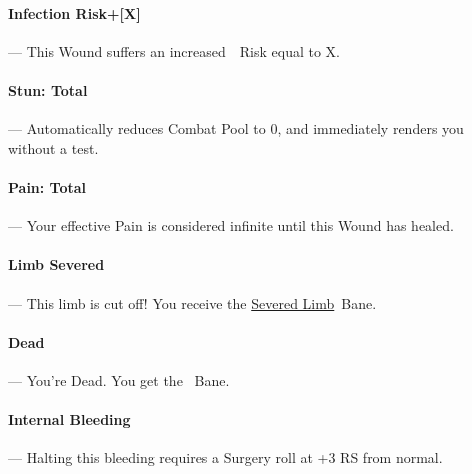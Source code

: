 \documentclass[oneside,11pt,english]{book}
\begin{document}
\vspace{-5pt}\paragraph[Infection Risk]{\label{par:Infection Risk}Infection Risk+[X]}---\quad
This Wound suffers an increased~~Risk equal to X.

\vspace{-5pt}\paragraph[Total]{\label{par:Stun: Total}Stun: Total}---\quad
Automatically reduces Combat Pool to 0, and immediately renders you  without a test.

\vspace{-5pt}\paragraph[Total]{\label{par:Pain: Total}Pain: Total}---\quad
Your effective Pain is considered infinite until this Wound has healed.

\vspace{-5pt}\paragraph[Limb Severed!]{\label{par:Limb Severed}Limb Severed}---\quad
This limb is cut off! You receive the \hyperref[bane:Severed Limb/Appendage]{Severed Limb}~Bane. 

\vspace{-5pt}\paragraph{\label{par:Dead}Dead}---\quad
You’re Dead. You get the ~Bane.

\vspace{-5pt}\paragraph{\label{par:Internal Bleeding}Internal Bleeding}---\quad
Halting this bleeding requires a Surgery roll at +3 RS from normal.
\newpage
\captionsetup{font=small} %
\end{document}
